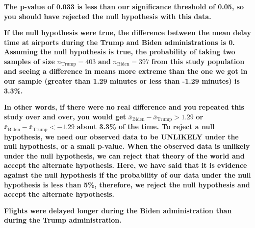 \documentclass[
  letterpaper,
  DIV=11,
  numbers=noendperiod]{scrartcl}
\begin{document}
\begin{tcolorbox}[enhanced jigsaw, toprule=.15mm, breakable, leftrule=.75mm, bottomrule=.15mm, rightrule=.15mm, colback=white, opacityback=0, colframe=quarto-callout-warning-color-frame, left=2mm, arc=.35mm]

\textbf{The p-value of 0.033 is less than our significance threshold of
0.05, so you should have rejected the null hypothesis with this data.}

\textbf{If the null hypothesis were true, the difference between the
mean delay time at airports during the Trump and Biden administrations
is 0. Assuming the null hypothesis is true, the probability of taking
two samples of size} \(n_{\text{Trump}}=403\) \textbf{and}
\(n_{\text{Biden}}=397\) \textbf{from this study population and seeing a
difference in means more extreme than the one we got in our sample
(greater than 1.29 minutes or less than -1.29 minutes) is 3.3\%.}

\textbf{In other words, if there were no real difference and you
repeated this study over and over, you would get}
\(\bar{x}_{\text{Biden}}-\bar{x}_{\text{Trump}}>1.29\) \textbf{or}
\(\bar{x}_{\text{Biden}}-\bar{x}_{\text{Trump}}<-1.29\) \textbf{about
3.3\% of the time. To reject a null hypothesis, we need our observed
data to be UNLIKELY under the null hypothesis, or a small p-value. When
the observed data is unlikely under the null hypothesis, we can reject
that theory of the world and accept the alternate hypothesis. Here, we
have said that it is evidence against the null hypothesis if the
probability of our data under the null hypothesis is less than 5\%,
therefore, we reject the null hypothesis and accept the alternate
hypothesis.}

\textbf{Flights were delayed longer during the Biden administration than
during the Trump administration.}

\end{tcolorbox}
\end{document}
